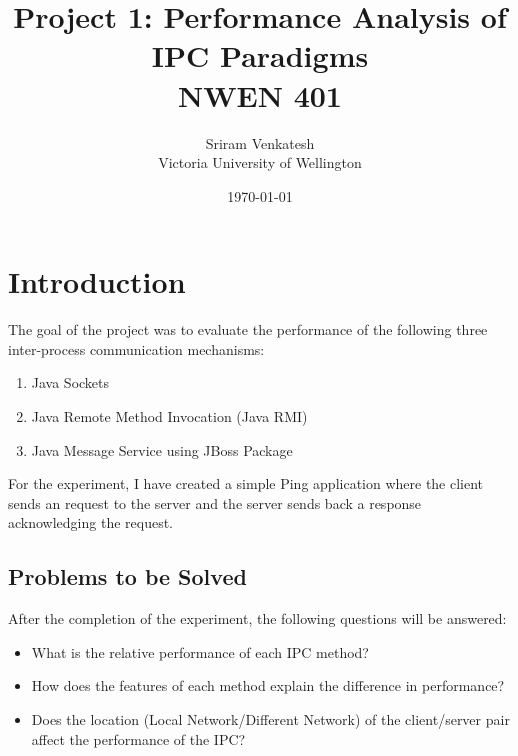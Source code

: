 \documentclass{article}
\title{Project 1: Performance Analysis of IPC Paradigms \\ NWEN 401} %
\author{Sriram Venkatesh \\ Victoria University of Wellington} %
\date{\today} %
\begin{document}
\maketitle %





\section{Introduction}
The goal of the project was to evaluate the performance of the following three inter-process communication mechanisms:

\begin{enumerate}
	\item Java Sockets
	\item Java Remote Method Invocation (Java RMI)
	\item Java Message Service using JBoss Package
\end{enumerate}

For the experiment, I have created a simple Ping application where the client sends an request to the server and the server sends back a response acknowledging the request. \\

\subsection{Problems to be Solved}
After the completion of the experiment, the following questions will be answered:
\begin{itemize}
	\item What is the relative performance of each IPC method?
	\item How does the features of each method explain the difference in performance?	
	\item Does the location (Local Network/Different Network) of the client/server pair affect the performance of the IPC?
\end{itemize}
\end{document}
